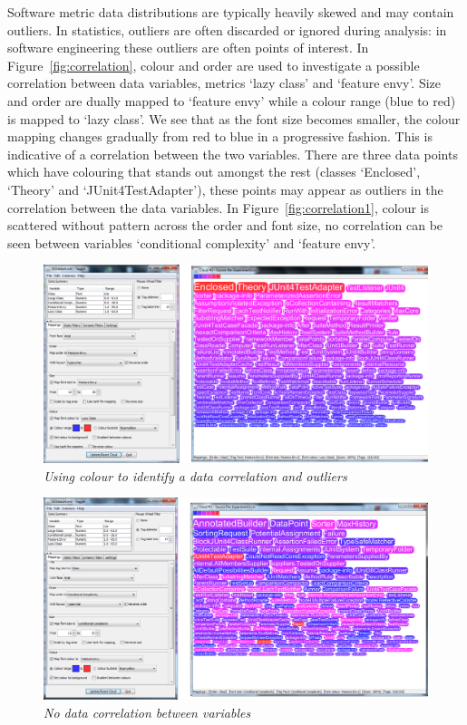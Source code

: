 Software metric data distributions are typically heavily skewed and may contain outliers. In statistics, outliers are often discarded or ignored during analysis: in software engineering these outliers are often points of interest. In Figure~\vref{fig:correlation}, colour and order are used to investigate a possible correlation between data variables, metrics `lazy class' and `feature envy'. Size and order are dually mapped to `feature envy' while a colour range (blue to red) is mapped to `lazy class'. We see that as the font size becomes smaller, the colour mapping changes gradually from red to blue in a progressive fashion. This is indicative of a correlation between the two variables. There are three data points which have colouring that stands out amongst the rest (classes `Enclosed', `Theory' and `JUnit4TestAdapter'), these points may appear as outliers in the correlation between the data variables. In Figure~\vref{fig:correlation1}, colour is scattered without pattern across the order and font size, no correlation can be seen between variables `conditional complexity' and `feature envy'.

\begin{figure}[!htb]
  	\centering
   	\includegraphics[scale=0.30]{correlation.png}
  	\caption{\textit{Using colour to identify a data correlation and outliers}}
	\label{fig:correlation}
\end{figure}

\begin{figure}[!htb]
  	\centering
   	\includegraphics[scale=0.30]{correlation1.png}
  	\caption{\textit{No data correlation between variables}}
	\label{fig:correlation1}
\end{figure}


